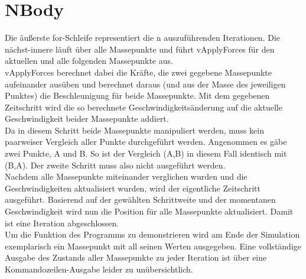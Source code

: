 \documentclass{article}
\newcommand{\enterProblemHeader}[1]{
}
\newcommand{\exitProblemHeader}[1]{
}
\newcounter{homeworkProblemCounter} %
\newcommand{\homeworkProblemName}{}
\newenvironment{homeworkProblem}[1][Problem \arabic{homeworkProblemCounter}]{ %
\stepcounter{homeworkProblemCounter} %
\renewcommand{\homeworkProblemName}{#1} %
\section{\homeworkProblemName} %
}{
}
\begin{document}
\begin{homeworkProblem}[NBody]
Die äußerste for-Schleife representiert die n auszuführenden Iterationen. Die nächst-innere läuft über alle Massepunkte und führt vApplyForces für den aktuellen und alle folgenden Massepunkte aus.\\
vApplyForces berechnet dabei die Kräfte, die zwei gegebene Massepunkte aufeinander ausüben und berechnet daraus (und aus der Masse des jeweiligen Punktes) die Beschleunigung für beide Massepunkte. Mit dem gegebenen Zeitschritt wird die so berechnete Geschwindigkeitsänderung auf die aktuelle Geschwindigkeit beider Massepunkte addiert.\\
Da in diesem Schritt beide Massepunkte manipuliert werden, muss kein paarweiser Vergleich aller Punkte durchgeführt werden. Angenommen es gäbe zwei Punkte, A und B. So ist der Vergleich (A,B) in diesem Fall identisch mit (B,A). Der zweite Schritt muss also nicht ausgeführt werden.\\
Nachdem alle Massepunkte miteinander verglichen wurden und die Geschwindigkeiten aktualisiert wurden, wird der eigentliche Zeitschritt ausgeführt. Basierend auf der gewählten Schrittweite und der momentanen Geschwindigkeit wird nun die Position für alle Massepunkte aktualisiert. Damit ist eine Iteration abgeschlossen.\\

Um die Funktion des Programms zu demonstrieren wird am Ende der Simulation exemplarisch ein Massepunkt mit all seinen Werten ausgegeben. Eine vollständige Ausgabe des Zustands aller Massepunkte zu jeder Iteration ist über eine Kommandozeilen-Ausgabe leider zu unübersichtlich.

\end{homeworkProblem}
\end{document}
